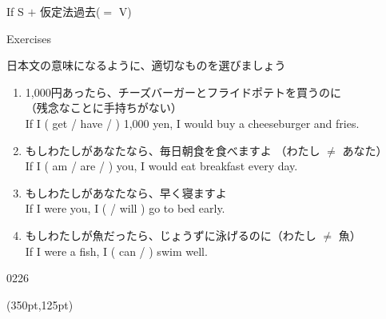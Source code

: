 \documentclass[aspectratio=169,xcolor={dvipsnames,table}]{beamer}
\begin{document}
\begin{frame}[plain,t]{If S $+$ 仮定法過去($=$ V)}
\begin{block}
\hfill{}

\hfill{}
 

\end{block}
\end{frame}
\begin{frame}[plain]{Exercises}

{\small 日本文の意味になるように、適切なものを選びましょう}

\begin{enumerate}
 \item 1,000円あったら、チーズバーガーとフライドポテトを買うのに\\
\hfill{\scriptsize （残念なことに手持ちがない）}\\
If I ( get / have /  ) 1,000 yen, I would buy a cheeseburger and fries.
 \item もしわたしがあなたなら、毎日朝食を食べますよ%
{\scriptsize （わたし $\neq$ あなた）}\\
If I ( am / are /  ) you, I would eat breakfast every day. 
 \item もしわたしがあなたなら、早く寝ますよ\\
If I were you, I (  / will ) go to bed early.
\item もしわたしが魚だったら、じょうずに泳げるのに{\scriptsize （わたし $\neq$ 魚）}\\
If I were a fish, I ( can /   ) swim well.
\end{enumerate}

\hfill{\tiny 0226}\,{\scriptsize {}} 

\begin{textblock*}{0.4\linewidth}(350pt,125pt)
\end{textblock*}
\end{frame}
\end{document}
